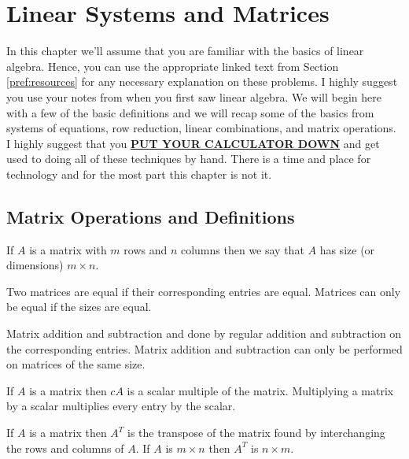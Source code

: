 \chapter{Linear Systems and Matrices}
In this chapter we'll assume that you are familiar with the basics of linear algebra.  Hence, you can use
the appropriate linked text from Section \ref{pref:resources} for any necessary explanation on these problems.  I highly suggest you use
your notes from when you first saw linear algebra.  We will begin here
with a few of the basic definitions and we will recap some of the basics from systems of
equations, row reduction, linear combinations, and matrix operations.  I highly suggest
that you \underline{{\bf PUT YOUR CALCULATOR DOWN}} and get used to doing all of these techniques by hand.
There is a time and place for technology and for the most part this chapter is not it.


\section{Matrix Operations and Definitions}
\begin{definition}
    If $A$ is a matrix with $m$ rows and $n$ columns then we say that $A$ has
    size (or
    dimensions) $m \times n$.
\end{definition}

\begin{definition}
    Two matrices are equal if their corresponding entries are equal. Matrices can only be
    equal if the sizes are equal.
\end{definition}

\begin{definition} 
    Matrix addition and subtraction and done by regular addition and subtraction on the
    corresponding entries. Matrix addition and subtraction can only be performed on
    matrices of the same size.
\end{definition}

\begin{definition}
    If $A$ is a matrix then $cA$ is a scalar multiple of the matrix.  Multiplying a matrix
    by a scalar multiplies every entry by the scalar.
\end{definition}

\begin{definition} 
    If $A$ is a matrix then $A^T$
    is the transpose of the matrix found by interchanging
    the rows and columns of $A$. If $A$ is $m \times n$ then $A^T$
    is $n \times m$.
\end{definition}
    
